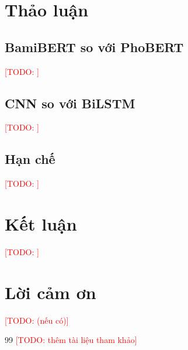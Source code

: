 \documentclass[11pt,a4paper]{article}
\newcommand{\todo}[1]{\textcolor{red}{[TODO: #1]}}
\begin{document}
\section{Thảo luận}
\label{sec:discussion}

\subsection{BamiBERT so với PhoBERT}
\todo{}

\subsection{CNN so với BiLSTM}
\todo{}

\subsection{Hạn chế}
\todo{}

\section{Kết luận}
\label{sec:conclusion}
\todo{}

\section*{Lời cảm ơn}
\todo{(nếu có)}

\begin{thebibliography}{99}
 \todo{thêm tài liệu tham khảo}
\end{thebibliography}
\end{document}
